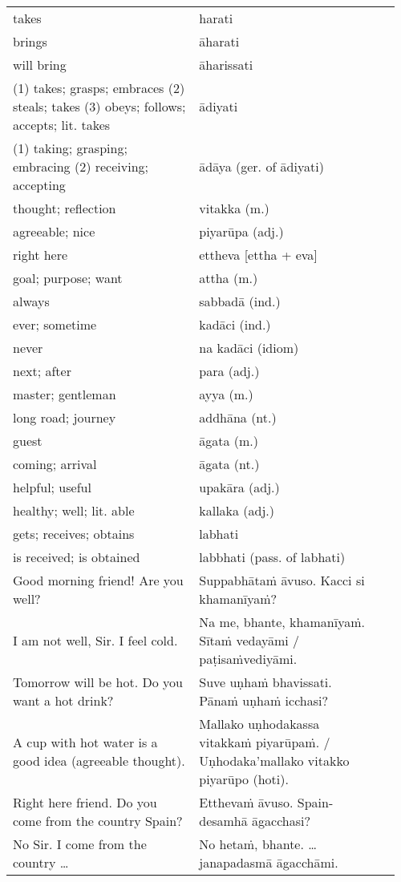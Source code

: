 \documentclass[a5paper]{memoir}
\begin{document}
\begin{longtable}{L{0.48\linewidth} L{0.48\linewidth} H}
takes & harati & \\[0pt]
brings & āharati & \\[0pt]
will bring & āharissati & \\[0pt]
(1) takes; grasps; embraces (2) steals; takes (3) obeys; follows; accepts; lit. takes & ādiyati & \\[0pt]
(1) taking; grasping; embracing (2) receiving; accepting & ādāya (ger. of ādiyati) & \\[0pt]
thought; reflection & vitakka (m.) & \\[0pt]
agreeable; nice & piyarūpa (adj.) & \\[0pt]
right here & ettheva [ettha + eva] & \\[0pt]
goal; purpose; want & attha (m.) & \\[0pt]
always & sabbadā (ind.) & \\[0pt]
ever; sometime & kadāci (ind.) & \\[0pt]
never & na kadāci (idiom) & \\[0pt]
next; after & para (adj.) & \\[0pt]
master; gentleman & ayya (m.) & \\[0pt]
long road; journey & addhāna (nt.) & \\[0pt]
guest & āgata (m.) & \\[0pt]
coming; arrival & āgata (nt.) & \\[0pt]
helpful; useful & upakāra (adj.) & \\[0pt]
healthy; well; lit. able & kallaka (adj.) & \\[0pt]
gets; receives; obtains & labhati & \\[0pt]
is received; is obtained & labbhati (pass. of labhati) & \\[0pt]
Good morning friend! Are you well? & Suppabhātaṁ āvuso. Kacci si khamanīyaṁ? & \\[0pt]
I am not well, Sir. I feel cold. & Na me, bhante, khamanīyaṁ. Sītaṁ vedayāmi / paṭisaṁvediyāmi. & \\[0pt]
Tomorrow will be hot. Do you want a hot drink? & Suve uṇhaṁ bhavissati. Pānaṁ uṇhaṁ icchasi? & \\[0pt]
A cup with hot water is a good idea (agreeable thought). & Mallako uṇhodakassa vitakkaṁ piyarūpaṁ. / Uṇhodaka'mallako vitakko piyarūpo (hoti). & \\[0pt]
Right here friend. Do you come from the country Spain? & Etthevaṁ āvuso. Spain-desamhā āgacchasi? & \\[0pt]
No Sir. I come from the country \ldots{} & No hetaṁ, bhante. \ldots{} janapadasmā āgacchāmi. & \\[0pt]

\end{longtable}
\end{document}
